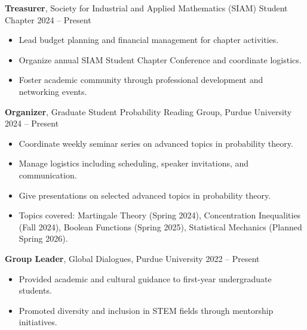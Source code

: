 \documentclass[11pt,letterpaper]{article}
\begin{document}
\textbf{Treasurer}, Society for Industrial and Applied Mathematics (SIAM) Student Chapter \hfill 2024 -- Present
\begin{itemize}
    \item Lead budget planning and financial management for chapter activities.
    \item Organize annual SIAM Student Chapter Conference and coordinate logistics.
    \item Foster academic community through professional development and networking events.
\end{itemize}

\textbf{Organizer}, Graduate Student Probability Reading Group, Purdue University \hfill 2024 -- Present
\begin{itemize}
    \item Coordinate weekly seminar series on advanced topics in probability theory.
    \item Manage logistics including scheduling, speaker invitations, and communication.
    \item Give presentations on selected advanced topics in probability theory.
    \item Topics covered: Martingale Theory (Spring 2024), Concentration Inequalities (Fall 2024), Boolean Functions (Spring 2025), Statistical Mechanics (Planned Spring 2026).
\end{itemize}

\textbf{Group Leader}, Global Dialogues, Purdue University \hfill 2022 -- Present
\begin{itemize}
    \item Provided academic and cultural guidance to first-year undergraduate students.
    \item Promoted diversity and inclusion in STEM fields through mentorship initiatives.
\end{itemize}
\end{document}
